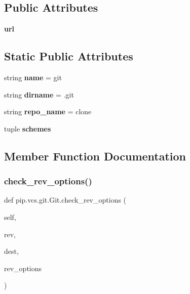 \subsection*{Public Attributes}
\begin{DoxyCompactItemize}
\item 
\mbox{\label{classpip_1_1vcs_1_1git_1_1_git_aa3d85476fb9507fa24b99fc462ec5b6f}} 
{\bfseries url}
\end{DoxyCompactItemize}
\subsection*{Static Public Attributes}
\begin{DoxyCompactItemize}
\item 
\mbox{\label{classpip_1_1vcs_1_1git_1_1_git_a43c4e9ee5c450f0555d59e8759eb198e}} 
string {\bfseries name} = \textquotesingle{}git\textquotesingle{}
\item 
\mbox{\label{classpip_1_1vcs_1_1git_1_1_git_a387cf578db7ddc6d6c18a764c7e8c5fb}} 
string {\bfseries dirname} = \textquotesingle{}.git\textquotesingle{}
\item 
\mbox{\label{classpip_1_1vcs_1_1git_1_1_git_aba5f232bc58876bd6b313b374bccb652}} 
string {\bfseries repo\+\_\+name} = \textquotesingle{}clone\textquotesingle{}
\item 
tuple {\bfseries schemes}
\end{DoxyCompactItemize}


\subsection{Member Function Documentation}
\mbox{\label{classpip_1_1vcs_1_1git_1_1_git_a3dcf087bd4e3b6ec255bc8de709ba7bf}} 
\subsubsection{\texorpdfstring{check\+\_\+rev\+\_\+options()}{check\_rev\_options()}}
{\footnotesize\ttfamily def pip.\+vcs.\+git.\+Git.\+check\+\_\+rev\+\_\+options (\begin{DoxyParamCaption}\item[{}]{self,  }\item[{}]{rev,  }\item[{}]{dest,  }\item[{}]{rev\+\_\+options }\end{DoxyParamCaption})}

